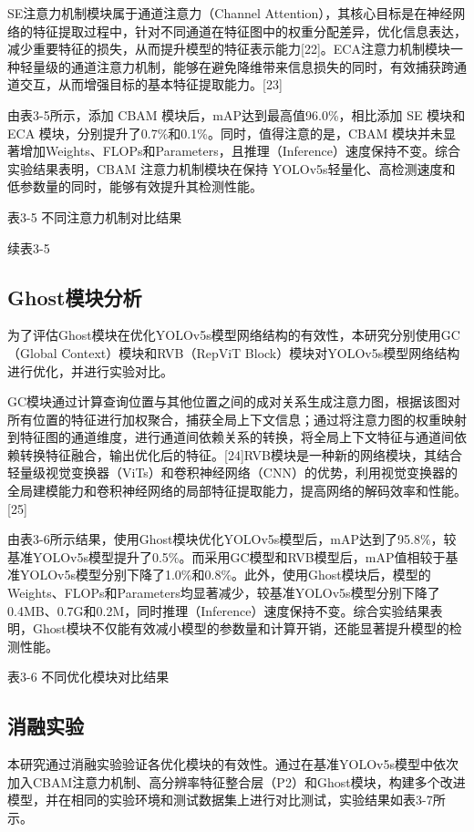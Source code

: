 \documentclass[12pt, a4paper, twoside]{ctexart}
\begin{document}
SE注意力机制模块属于通道注意力（Channel Attention），其核心目标是在神经网络的特征提取过程中，针对不同通道在特征图中的权重分配差异，优化信息表达，减少重要特征的损失，从而提升模型的特征表示能力[22]。ECA注意力机制模块一种轻量级的通道注意力机制，能够在避免降维带来信息损失的同时，有效捕获跨通道交互，从而增强目标的基本特征提取能力。[23]

由表3-5所示，添加 CBAM 模块后，mAP达到最高值96.0\%，相比添加 SE 模块和 ECA 模块，分别提升了0.7\%和0.1\%。同时，值得注意的是，CBAM 模块并未显著增加Weights、FLOPs和Parameters，且推理（Inference）速度保持不变。综合实验结果表明，CBAM 注意力机制模块在保持 YOLOv5s轻量化、高检测速度和低参数量的同时，能够有效提升其检测性能。

表3-5 不同注意力机制对比结果

续表3-5


\subsection{Ghost模块分析}

为了评估Ghost模块在优化YOLOv5s模型网络结构的有效性，本研究分别使用GC（Global Context）模块和RVB（RepViT Block）模块对YOLOv5s模型网络结构进行优化，并进行实验对比。

GC模块通过计算查询位置与其他位置之间的成对关系生成注意力图，根据该图对所有位置的特征进行加权聚合，捕获全局上下文信息；通过将注意力图的权重映射到特征图的通道维度，进行通道间依赖关系的转换，将全局上下文特征与通道间依赖转换特征融合，输出优化后的特征。[24]RVB模块是一种新的网络模块，其结合轻量级视觉变换器（ViTs）和卷积神经网络（CNN）的优势，利用视觉变换器的全局建模能力和卷积神经网络的局部特征提取能力，提高网络的解码效率和性能。[25]

由表3-6所示结果，使用Ghost模块优化YOLOv5s模型后，mAP达到了95.8\%，较基准YOLOv5s模型提升了0.5\%。而采用GC模型和RVB模型后，mAP值相较于基准YOLOv5s模型分别下降了1.0\%和0.8\%。此外，使用Ghost模块后，模型的Weights、FLOPs和Parameters均显著减少，较基准YOLOv5s模型分别下降了0.4MB、0.7G和0.2M，同时推理（Inference）速度保持不变。综合实验结果表明，Ghost模块不仅能有效减小模型的参数量和计算开销，还能显著提升模型的检测性能。

表3-6 不同优化模块对比结果


\subsection{消融实验}

本研究通过消融实验验证各优化模块的有效性。通过在基准YOLOv5s模型中依次加入CBAM注意力机制、高分辨率特征整合层（P2）和Ghost模块，构建多个改进模型，并在相同的实验环境和测试数据集上进行对比测试，实验结果如表3-7所示。
\end{document}
